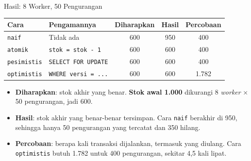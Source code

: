 \documentclass[aspectratio=169, table, 12pt]{beamer}
\begin{document}
\begin{frame}{{\Large Hasil: 8 Worker, 50 Pengurangan}}
  \vspace{5pt}
  {\centering
  {\small
  \begin{tabularx}{\textwidth}{lXccc}
    \hline
    \textbf{Cara} & \textbf{Pengamannya} & \textbf{Diharapkan} & \textbf{Hasil} & \textbf{Percobaan} \\
    \hline
    \texttt{naif}       & Tidak ada                 & 600 & 950 & 400 \\
    \hline
    \texttt{atomik}     & \texttt{stok = stok - 1}  & 600 & 600 & 400 \\
    \hline
    \texttt{pesimistis} & \texttt{SELECT FOR UPDATE} & 600 & 600 & 400 \\
    \hline
    \texttt{optimistis} & \texttt{WHERE versi = ...} & 600 & 600 & 1.782 \\
    \hline
  \end{tabularx}}\par}

  \vspace{6pt}
  {\footnotesize
  \begin{itemize}
    \item \textbf{Diharapkan}: stok akhir yang benar. \textbf{Stok awal 1.000}
          dikurangi 8 \textit{worker} $\times$ 50 pengurangan, jadi 600.
    \item \textbf{Hasil}: stok akhir yang benar-benar tersimpan. Cara
          \texttt{naif} berakhir di 950, sehingga hanya 50 pengurangan yang
          tercatat dan 350 hilang.
    \item \textbf{Percobaan}: berapa kali transaksi dijalankan, termasuk yang
          diulang. Cara \texttt{optimistis} butuh 1.782 untuk 400
          pengurangan, sekitar 4,5 kali lipat.
  \end{itemize}}
\end{frame}
\end{document}
